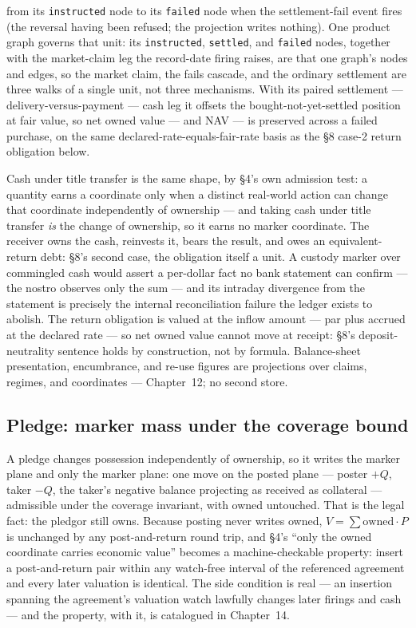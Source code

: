 \documentclass[11pt,a4paper]{article}
\begin{document}
from its \texttt{instructed} node to its \texttt{failed} node when the settlement-fail
event fires (the reversal having been refused; the projection writes nothing). One
product graph governs that unit: its \texttt{instructed}, \texttt{settled}, and
\texttt{failed} nodes, together with the market-claim leg the record-date firing raises,
are that one graph's nodes and edges, so the market claim, the fails cascade, and the
ordinary settlement are three walks of a single unit, not three mechanisms. With its
paired settlement --- delivery-versus-payment --- cash leg it offsets the
bought-not-yet-settled position at fair value, so net owned value --- and NAV --- is
preserved across a failed purchase, on the same declared-rate-equals-fair-rate basis as
the \S8 case-2 return obligation below.

Cash under title transfer is the same shape, by \S4's own admission test: a
quantity earns a coordinate only when a distinct real-world action can change
that coordinate independently of ownership --- and taking cash under title
transfer \emph{is} the change of ownership, so it earns no marker coordinate.
The receiver owns the cash, reinvests it, bears the result, and owes an
equivalent-return debt: \S8's second case, the obligation itself a unit. A
custody marker over commingled cash would assert a per-dollar fact no bank
statement can confirm --- the nostro observes only the sum --- and its
intraday divergence from the statement is precisely the internal
reconciliation failure the ledger exists to abolish. The return obligation is
valued at the inflow amount --- par plus accrued at the declared rate --- so
net owned value cannot move at receipt: \S8's deposit-neutrality sentence
holds by construction, not by formula. Balance-sheet presentation, encumbrance,
and re-use figures are projections over claims, regimes, and coordinates ---
Chapter~12; no second store.

\subsection{Pledge: marker mass under the coverage bound}

A pledge changes possession independently of ownership, so it writes the
marker plane and only the marker plane: one move on the posted plane ---
poster $+Q$, taker $-Q$, the taker's negative balance projecting as received
as collateral --- admissible under the coverage invariant, with owned
untouched. That is the legal fact: the pledgor still owns. Because posting
never writes owned, $V=\sum \mathrm{owned}\cdot P$ is unchanged by any
post-and-return round trip, and \S4's ``only the owned coordinate carries
economic value'' becomes a machine-checkable property: insert a
post-and-return pair within any watch-free interval of the referenced
agreement and every later valuation is identical. The side condition is real
--- an insertion spanning the agreement's valuation watch lawfully changes
later firings and cash --- and the property, with it, is catalogued in
Chapter~14.
\end{document}
